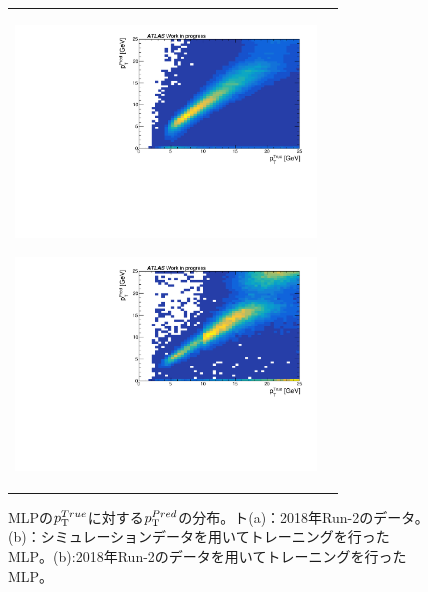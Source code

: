 \begin{figure}
    \begin{tabular}{cc}
    \centering
    \begin{minipage}[b]{0.45\hsize}%
        \centering
        \hspace*{-1cm}
        \includegraphics[clip, width=8cm]{fig/4/MC_pred_true_25.pdf}
        \subcaption{}
        \label{fig:zannsa_25_MC}
    \end{minipage}%
    \begin{minipage}[b]{0.7\hsize}%
        \centering
        \includegraphics[clip, width=8cm]{fig/4/pred_true_25.pdf}
        \subcaption{}
        \label{fig:zannsa_25_Data}
    \end{minipage}%
    \end{tabular}
    \caption{MLPの$p_{\rm{T}}^{True}$に対する$p_{\rm{T}}^{Pred}$の分布。ト(a)：2018年Run-2のデータ。(b)：シミュレーションデータを用いてトレーニングを行ったMLP。(b):2018年Run-2のデータを用いてトレーニングを行ったMLP。}
    \label{25}
\end{figure}




